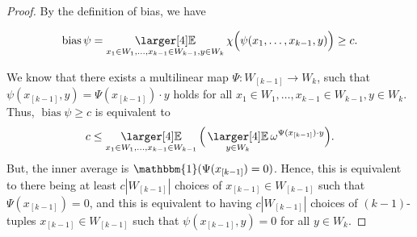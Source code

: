 \documentclass[a4paper,11pt]{article}
\theoremstyle{definition}
\newcommand\id{\mathbbm{1}}
\newcommand{\on}[1]{
	\operatorname{#1}
}
\newcommand{\exx}{
  \mathop{
    \mathchoice{\vcenter{\hbox{\larger[4]$\mathbb{E}$}}}
               {\kern0pt\mathbb{E}}
               {\kern0pt\mathbb{E}}
               {\kern0pt\mathbb{E}}
  }\displaylimits
}
\begin{document}
\begin{proof}
    By the definition of bias, we have 
    
    \[\on{bias} \psi =\exx_{x_1 \in W_1, \dots, x_{k-1} \in W_{k-1}, y \in W_k} \chi\Big(\psi(x_1, \dots, x_{k-1}, y)\Big) \geq c.\]
    
    We know that there exists a multilinear map $\Psi : W_{[k-1]} \to W_k$, such that $\psi(x_{[k-1]},y) = \Psi(x_{[k-1]}) \cdot y$ holds for all $x_1 \in W_1, \dots, x_{k-1} \in W_{k-1}, y \in W_k$. Thus, $\on{bias} \psi \geq c$ is equivalent to
    \[c \leq \exx_{x_1 \in W_1, \dots, x_{k-1} \in W_{k-1}} \Big(\exx_{y \in W_k} \omega^{\Psi(x_{[k-1]}) \cdot y}\Big).\]
    But, the inner average is $\id(\Psi(x_{[k-1]}) = 0)$. Hence, this is equivalent to there being at least $c|W_{[k-1]}|$ choices of $x_{[k-1]} \in W_{[k-1]}$ such that $\Psi(x_{[k-1]}) = 0$, and this is equivalent to having $c|W_{[k-1]}|$ choices of $(k-1)$-tuples $x_{[k-1]} \in W_{[k-1]}$ such that $\psi(x_{[k-1]}, y) = 0$ for all $y \in W_k$.
\end{proof}
\end{document}
